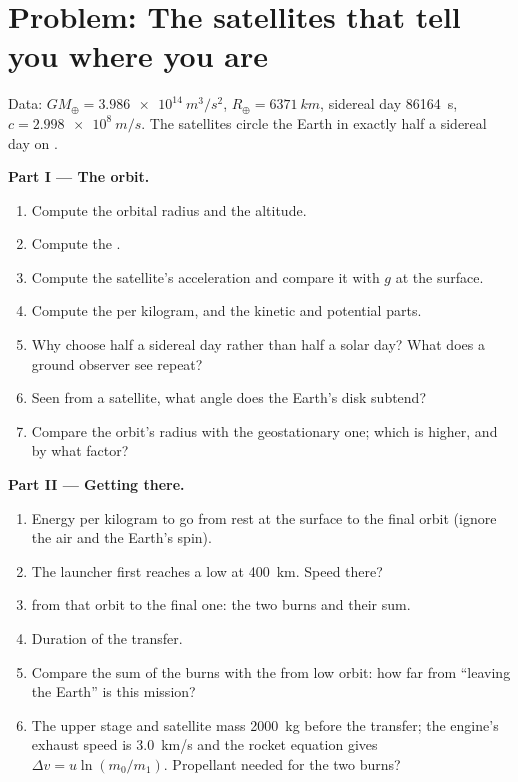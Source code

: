 \section{Problem: The satellites that tell you where you are}

\begin{problem}
\label{pb:b1:central-forces:1}
Data: $GM_\oplus = \qty{3.986e14}{m^3/s^2}$, $R_\oplus = \qty{6371}{km}$,
sidereal day \qty{86164}{s}, $c = \qty{2.998e8}{m/s}$. The satellites
circle the Earth in exactly half a sidereal day on .

\medskip
\noindent\textbf{Part I --- The orbit.}
\begin{enumerate}
  \item Compute the orbital radius and the altitude.
  \item Compute the .
  \item Compute the satellite's acceleration and compare it with $g$ at
        the surface.
  \item Compute the  per kilogram, and the kinetic and
        potential parts.
  \item Why choose half a sidereal day rather than half a solar day?
        What does a ground observer see repeat?
  \item Seen from a satellite, what angle does the Earth's disk subtend?
  \item Compare the orbit's radius with the geostationary one; which is
        higher, and by what factor?
\end{enumerate}

\medskip
\noindent\textbf{Part II --- Getting there.}
\begin{enumerate}[resume]
  \item Energy per kilogram to go from rest at the surface to the final
        orbit (ignore the air and the Earth's spin).
  \item The launcher first reaches a low  at \qty{400}{km}.
        Speed there?
  \item {} from that orbit to the final one: the two burns
        and their sum.
  \item Duration of the transfer.
  \item Compare the sum of the burns with the  from low
        orbit: how far from ``leaving the Earth'' is this mission?
  \item The upper stage and satellite mass \qty{2000}{kg} before the
        transfer; the engine's exhaust speed is \qty{3.0}{km/s} and the
        rocket equation gives $\Delta v = u\ln(m_0/m_1)$. Propellant
        needed for the two burns?
\end{enumerate}


\end{problem}
